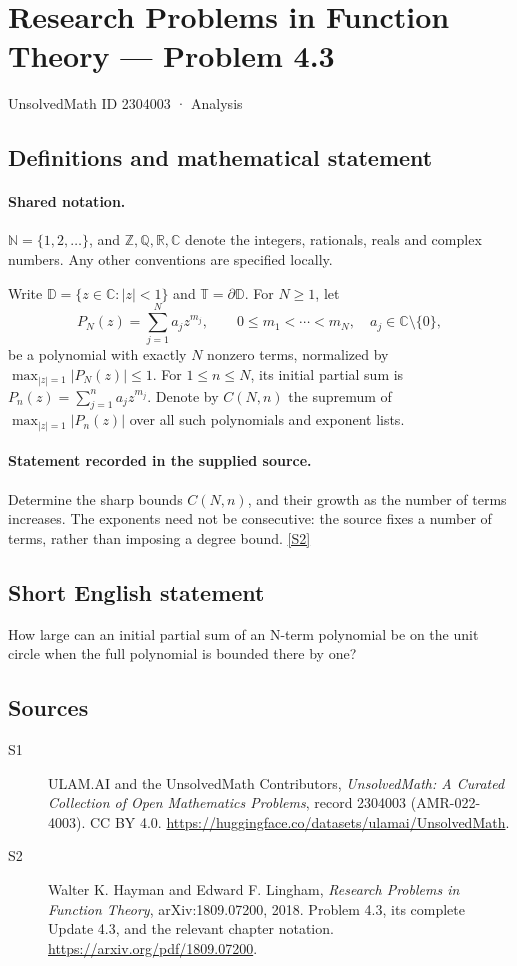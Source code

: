 \documentclass[11pt]{book}
\newcommand{\sref}[2]{\hyperlink{source:#1:#2}{[S#2]}}
\begin{document}
\setcounter{section}{2304002}
\section{Research Problems in Function Theory — Problem 4.3}\label{2304003}
{\small\sffamily UnsolvedMath ID 2304003 · Analysis}
\subsection{Definitions and mathematical statement}

\paragraph{Shared notation.}$\mathbb N=\{1,2,\ldots\}$, and $\mathbb Z,\mathbb Q,\mathbb R,\mathbb C$ denote the integers, rationals, reals and complex numbers. Any other conventions are specified locally.


Write $\mathbb D=\{z\in\mathbb C:|z|<1\}$ and $\mathbb T=\partial\mathbb D$. For $N\ge1$, let
\[P_N(z)=\sum_{j=1}^Na_jz^{m_j},\qquad 0\le m_1<\cdots<m_N,\quad a_j\in\mathbb C\setminus\{0\},
\]
be a polynomial with exactly $N$ nonzero terms, normalized by $\max_{|z|=1}|P_N(z)|\le1$. For $1\le n\le N$, its initial partial sum is $P_n(z)=\sum_{j=1}^na_jz^{m_j}$. Denote by $C(N,n)$ the supremum of $\max_{|z|=1}|P_n(z)|$ over all such polynomials and exponent lists.
\paragraph{Statement recorded in the supplied source.}
Determine the sharp bounds $C(N,n)$, and their growth as the number of terms increases. The exponents need not be consecutive: the source fixes a number of terms, rather than imposing a degree bound. \sref{2304003}{2}
\subsection{Short English statement}
How large can an initial partial sum of an N-term polynomial be on the unit circle when the full polynomial is bounded there by one?
\subsection{Sources}
\begin{description}
\item[\hypertarget{source:2304003:1}{S1}] ULAM.AI and the UnsolvedMath Contributors, \emph{UnsolvedMath: A Curated Collection of Open Mathematics Problems}, record 2304003 (AMR-022-4003). CC BY 4.0. \url{https://huggingface.co/datasets/ulamai/UnsolvedMath}.
\item[\hypertarget{source:2304003:2}{S2}] Walter K. Hayman and Edward F. Lingham, \emph{Research Problems in Function Theory}, arXiv:1809.07200, 2018. Problem 4.3, its complete Update 4.3, and the relevant chapter notation. \url{https://arxiv.org/pdf/1809.07200}.
\end{description}
\label{end:2304003}
\end{document}
